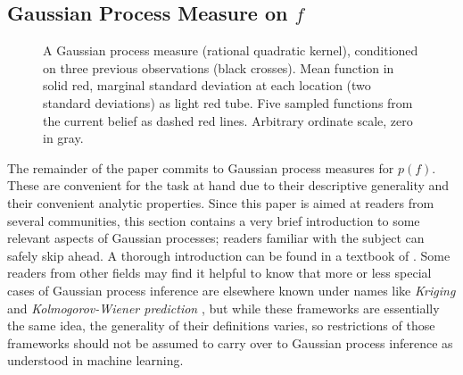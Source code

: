 \documentclass[twoside,11pt]{article}
\newcommand{\inputTikZ}[1]{%
 }
\newcommand{\inputTikZ}[1]{%
   \beginpgfgraphicnamed{#1-external}%
   \endpgfgraphicnamed%
 }
\begin{document}
\subsection{Gaussian Process Measure on $f$}
\label{sec:gauss-proc-meas}

\begin{figure}
  \centering
  \inputTikZ{figures/GPonly}
  \caption{A Gaussian process measure (rational quadratic kernel),
    conditioned on three previous observations (black crosses). Mean
    function in solid red, marginal standard deviation at each
    location (two standard deviations) as light red tube. Five sampled
    functions from the current belief as dashed red lines. Arbitrary
    ordinate scale, zero in gray.}
  \label{fig:GP_init}
\end{figure}

The remainder of the paper commits to Gaussian process measures for
$p(f)$. These are convenient for the task at hand due to their
descriptive generality and their convenient analytic properties. Since
this paper is aimed at readers from several communities, this section
contains a very brief introduction to some relevant aspects of
Gaussian processes; readers familiar with the subject can safely skip
ahead. A thorough introduction can be found in a textbook of
\citet{RasmussenWilliams}. Some readers from other fields may find it
helpful to know that more or less special cases of Gaussian process
inference are elsewhere known under names like \emph{Kriging}
\citep{krigestatistical} and \emph{Kolmogorov-Wiener prediction}
\citep{wiener1957prediction}, but while these frameworks are
essentially the same idea, the generality of their definitions varies,
so restrictions of those frameworks should not be assumed to carry
over to Gaussian process inference as understood in machine learning.
\end{document}

